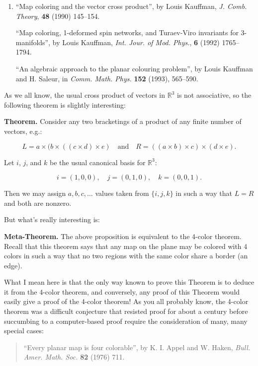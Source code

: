 \documentclass{article}
\begin{document}
\begin{enumerate}
\def\labelenumi{\arabic{enumi})}
\item
  ``Map coloring and the vector cross product'', by Louis Kauffman,
  \emph{J. Comb. Theory}, \textbf{48} (1990) 145--154.

  ``Map coloring, 1-deformed spin networks, and Turaev-Viro invariants
  for 3-manifolds'', by Louis Kauffman, \emph{Int. Jour. of Mod. Phys.},
  \textbf{6} (1992) 1765--1794.

  ``An algebraic approach to the planar colouring problem'', by Louis
  Kauffman and H. Saleur, in \emph{Comm. Math. Phys.} \textbf{152}
  (1993), 565--590.
\end{enumerate}

As we all know, the usual cross product of vectors in \(\mathbb{R}^3\)
is not associative, so the following theorem is slightly interesting:

\textbf{Theorem.} Consider any two bracketings of a product of any
finite number of vectors, e.g.:

\[L = a \times (b \times ((c \times d) \times e) \quad\text{and}\quad  R = ((a \times b) \times c) \times (d \times e).\]

Let \(i\), \(j\), and \(k\) be the usual canonical basis for
\(\mathbb{R}^3\):

\[i = (1,0,0), \quad j = (0,1,0), \quad k = (0,0,1).\]

Then we may assign \(a,b,c,\ldots\) values taken from \(\{i,j,k\}\) in
such a way that \(L = R\) and both are nonzero.

But what's really interesting is:

\textbf{Meta-Theorem.} The above proposition is equivalent to the
4-color theorem. Recall that this theorem says that any map on the plane
may be colored with 4 colors in such a way that no two regions with the
same color share a border (an edge).

What I mean here is that the only way known to prove this Theorem is to
deduce it from the 4-color theorem, and conversely, any proof of this
Theorem would easily give a proof of the 4-color theorem! As you all
probably know, the 4-color theorem was a difficult conjecture that
resisted proof for about a century before succumbing to a computer-based
proof require the consideration of many, many special cases:

\begin{quote}
``Every planar map is four colorable'', by K. I. Appel and W. Haken,
\emph{Bull. Amer. Math. Soc.} \textbf{82} (1976) 711.
\end{quote}
\end{document}
